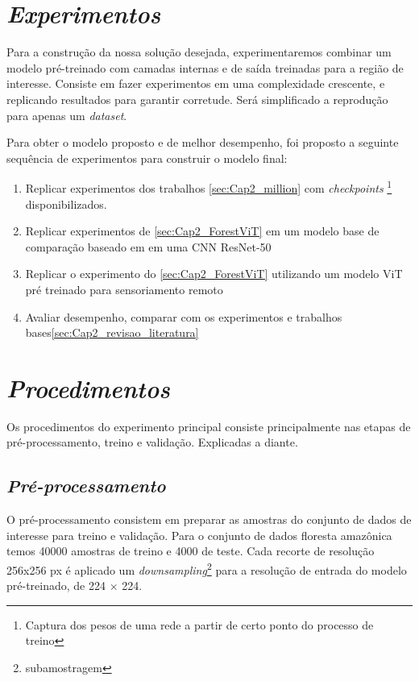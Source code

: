 

\section{\textit{Experimentos}}\label{sec:Cap3_Experimentos}

Para a construção da nossa solução desejada, experimentaremos combinar um modelo pré-treinado com camadas internas e de saída treinadas para a região de interesse.
Consiste em fazer experimentos em uma complexidade crescente, e replicando resultados para garantir corretude. Será simplificado a reprodução para apenas um \textit{dataset}.


Para obter o modelo proposto e de melhor desempenho, foi proposto a seguinte sequência de experimentos para construir o modelo final:

\begin{enumerate}
\item  Replicar experimentos dos trabalhos \ref{sec:Cap2_million} com \textit{checkpoints} \footnote{Captura dos pesos de uma rede a partir de certo ponto do processo de treino} disponibilizados. 
\item  Replicar experimentos de \ref{sec:Cap2_ForestViT} em um modelo base de comparação baseado em em uma CNN ResNet-50
\item  Replicar o experimento do \ref{sec:Cap2_ForestViT} utilizando um modelo ViT pré treinado para sensoriamento remoto
\item Avaliar desempenho, comparar com os experimentos e trabalhos bases\ref{sec:Cap2_revisao_literatura}
\end{enumerate}


    

\section{\textit{Procedimentos}}\label{sec:Cap3_Procedimentos}

Os procedimentos do experimento principal consiste principalmente nas etapas de 
pré-processamento, treino e validação. Explicadas a diante.

\subsection{\textit{Pré-processamento}}\label{sec:Cap3_PreProcess}
O pré-processamento consistem em preparar as amostras do conjunto de dados de interesse para treino e validação. Para o conjunto de dados floresta amazônica temos 40000 amostras de treino e 4000 de teste. Cada recorte de resolução 256x256 px é aplicado um \textit{downsampling}\footnote{subamostragem} para a resolução de entrada do modelo pré-treinado, de 224 × 224. 

